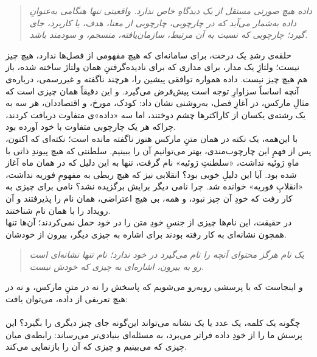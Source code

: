 \begin{quote}
\itshape
داده هیچ صورتی مستقل از یک دیدگاهِ خاص ندارد. واقعیتی تنها هنگامی به‌عنوانِ داده به‌شمار می‌آید که در چارچوبی، چارچوبی از معنا، هدف، یا کاربرد، جای گیرد؛ چارچوبی که نسبت به آن مرتبط، سازمان‌یافته، منسجم، و سودمند باشد.
\end{quote}
حلقه‌ی رشدِ یک درخت، برای سامانه‌ای که هیچ مفهومی از فصل‌ها ندارد، هیچ چیز نیست؛ ولتاژِ یک مدار، برای مداری که برای نادیده‌گرفتنِ همان ولتاژ ساخته شده، باز هم هیچ چیز نیست. داده همواره توافقی پیشین را، هرچند ناگفته و غیررسمی، درباره‌ی آنچه اساساً سزاوارِ توجه است پیش‌فرض می‌گیرد. و این دقیقاً همان چیزی است که مثالِ مارکس، در آغازِ فصل، به‌روشنی نشان داد: کودک، مورخ، و اقتصاددان، هر سه به یک رشته‌ی یکسان از کاراکترها چشم دوختند، اما سه «داده»ی متفاوت دریافت کردند، چراکه هر یک چارچوبی متفاوت با خود آورده بود.\\
با این‌همه، یک نکته در همان متنِ مارکس هنوز ناگفته مانده است؛ نکته‌ای که اکنون، پس از فهمِ این چارچوب‌مندی، بهتر می‌توانیم آن را ببینیم. سلطنتی که هیچ پیوندِ ذاتی با ماهِ ژوئیه نداشت، «سلطنتِ ژوئیه» نام گرفت، تنها به این دلیل که در همان ماه آغاز شده بود. آیا این دلیلِ خوبی بود؟ انقلابی نیز که هیچ ربطی به مفهومِ فوریه نداشت، «انقلابِ فوریه» خوانده شد. چرا نامی دیگر برایش برگزیده نشد؟ نامی برای چیزی به کار رفت که خودِ آن چیز نبود، و همه، بی هیچ اعتراضی، همان نام را پذیرفتند و آن رویداد را با همان نام شناختند.\\
در حقیقت، این نام‌ها چیزی از جنسِ خودِ متن را در خود حمل نمی‌کردند؛ آن‌ها تنها همچون نشانه‌ای به کار رفته بودند برای اشاره به چیزی دیگر، بیرون از خودشان.\\

\begin{quote}
\itshape
یک نام هرگز محتوای آنچه را نام می‌گیرد در خود ندارد؛ نام تنها نشانه‌ای است رو به بیرون، اشاره‌ای به چیزی که خودش نیست.
\end{quote}
و اینجاست که با پرسشی روبه‌رو می‌شویم که پاسخش را نه در متنِ مارکس، و نه در هیچ تعریفی از داده، می‌توان یافت:\\
\\چگونه یک کلمه، یک عدد یا یک نشانه می‌تواند این‌گونه جای چیز دیگری را بگیرد؟
این پرسش ما را از خودِ داده فراتر می‌برد، به مسئله‌ای بنیادی‌تر می‌رساند: رابطه‌ی میان چیزی که می‌بینیم و چیزی که آن را بازنمایی می‌کند.